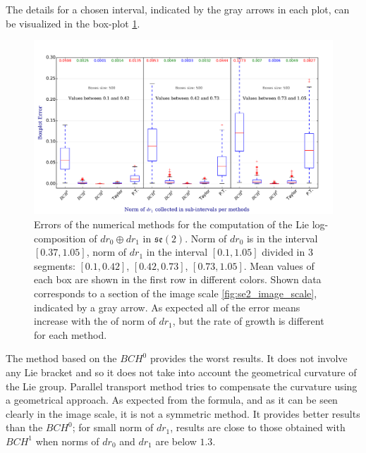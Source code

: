 The details for a chosen interval, indicated by the gray arrows in each plot, can be visualized in the box-plot \ref{fig:se2_boxplot}.
%
\begin{figure}[!ht]
	\hspace{-1cm}
	\includegraphics[scale=0.51]{figures/se2_boxplot.pdf}
	\caption{Errors of the numerical methods for the computation of the Lie log-composition of $dr_{0} \oplus dr_{1}$ in $\mathfrak{se}(2)$. Norm of $dr_{0}$ is in the interval $[0.37,1.05]$, norm of $dr_{1}$ in the interval $[0.1, 1.05]$ divided in 3 segments: $[0.1,0.42] $, $[0.42, 0.73] $, $[0.73, 1.05] $. Mean values of each box are shown in the first row in different colors. Shown data corresponds to a section of the image scale \ref{fig:se2_image_scale}, indicated by a gray arrow. As expected all of the error means increase with the of norm of $dr_1$, but the rate of growth is different for each method.}
	\label{fig:se2_boxplot}
\end{figure}
%

The method based on the $BCH^0$ provides the worst results. It does not involve any Lie bracket and so it does not take into account the geometrical curvature of the Lie group. Parallel transport method tries to compensate the curvature using a geometrical approach. As expected from the formula, and as it can be seen clearly in the image scale, it is not a symmetric method. It provides better results than the $BCH^0$; for small norm of $dr_1$, results are close to those obtained with $BCH^1$ when norms of $dr_0$ and $dr_1$ are below $1.3$.

